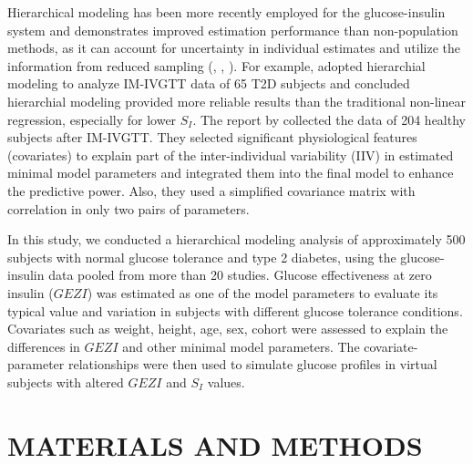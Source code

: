 \documentclass[utf8]{frontiersSCNS} %
\begin{document}
Hierarchical modeling has been more recently employed for the glucose-insulin system and demonstrates improved estimation performance than non-population methods, as it can account for uncertainty in individual estimates and utilize the information from reduced sampling (\citet{agbaje_2003}, \citet{Denti2009}, \citet{Denti2010}). For example, \citet{agbaje_2003} adopted hierarchial modeling to analyze IM-IVGTT data of 65 T2D subjects and concluded hierarchial modeling provided more reliable results than the traditional non-linear regression, especially for lower $S_I$. The report by \citet{Denti2010} collected the data of 204 healthy subjects after IM-IVGTT. They selected significant physiological features (covariates) to explain part of the inter-individual variability (IIV) in estimated minimal model parameters and integrated them into the final model to enhance the predictive power. Also, they used a simplified covariance matrix with correlation in only two pairs of parameters. %

In this study, we conducted a hierarchical modeling analysis of approximately 500 subjects with normal glucose tolerance and type 2 diabetes, using the glucose-insulin data pooled from more than 20 studies. Glucose effectiveness at zero insulin ($GEZI$) was estimated as one of the model parameters to evaluate its typical value and variation in subjects with different glucose tolerance conditions. Covariates such as weight, height, age, sex, cohort were assessed to explain the differences in $GEZI$ and other minimal model parameters. The covariate-parameter relationships were then used to simulate glucose profiles in virtual subjects with altered $GEZI$ and $S_I$ values. 
\section{MATERIALS AND METHODS}
\end{document}
